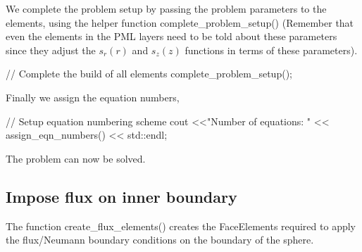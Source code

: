 We complete the problem setup by passing the problem parameters to the elements, using the helper function {\ttfamily complete\+\_\+problem\+\_\+setup()} (Remember that even the elements in the P\+ML layers need to be told about these parameters since they adjust the $ s_r(r) $ and $ s_z(z) $ functions in terms of these parameters).

 
\begin{DoxyCodeInclude}
 \textcolor{comment}{// Complete the build of all elements}
 complete\_problem\_setup();

\end{DoxyCodeInclude}


Finally we assign the equation numbers,

 
\begin{DoxyCodeInclude}
 \textcolor{comment}{// Setup equation numbering scheme}
 cout <<\textcolor{stringliteral}{"Number of equations: "} << assign\_eqn\_numbers() << std::endl;

\end{DoxyCodeInclude}


The problem can now be solved.



\hypertarget{index_inner_flx}{}\subsection{Impose flux on inner boundary}\label{index_inner_flx}
The function {\ttfamily create\+\_\+flux\+\_\+elements()} creates the Face\+Elements required to apply the flux/\+Neumann boundary conditions on the boundary of the sphere.

